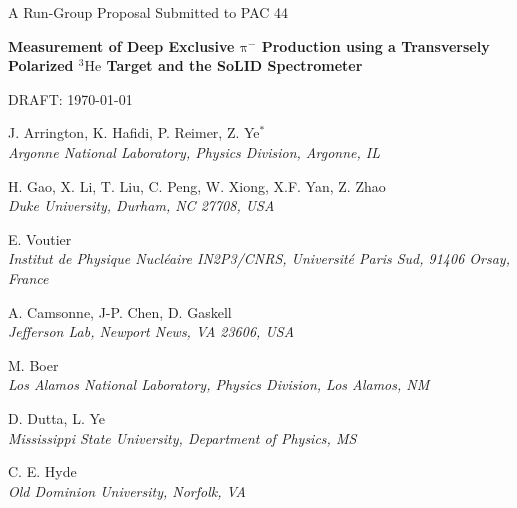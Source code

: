 \documentclass{article}
\begin{document}

\begin{center}

{\Huge A Run-Group Proposal Submitted to PAC 44}

\vspace*{25pt}

{\LARGE\bf
Measurement of Deep Exclusive $\mathrm\pi^-$ Production
using a Transversely Polarized $\mathrm{^{3}He}$ Target
and the SoLID Spectrometer}

\vspace*{2ex}
DRAFT: \today

\vspace*{30pt}

J. Arrington, K. Hafidi, P. Reimer, Z. Ye$^\ast$ \\
\vspace*{5pt}
{\it Argonne National Laboratory, Physics Division, Argonne, IL}
\vspace*{15pt}

H. Gao, X. Li, T. Liu, C. Peng, W. Xiong, X.F. Yan, Z. Zhao\\
\vspace*{5pt}
{\it Duke University, Durham, NC 27708, USA}
\vspace*{15pt}

E. Voutier\\
\vspace*{5pt}
{\it Institut de Physique Nucl\'eaire IN2P3/CNRS, Universit\'e Paris Sud, 
91406 Orsay, France}
\vspace*{15pt}

A. Camsonne,  J-P. Chen, D. Gaskell\\
\vspace*{5pt}
{\it  Jefferson Lab, Newport News, VA 23606, USA}
\vspace*{15pt}

M. Boer\\
\vspace*{5pt}
{\it Los Alamos National Laboratory, Physics Division, Los Alamos, NM}
\vspace*{15pt}

D. Dutta, L. Ye\\
\vspace*{5pt}
{\it Mississippi State University, Department of Physics, MS}
\vspace*{15pt}

C. E. Hyde \\
\vspace*{5pt}
{\it Old Dominion University, Norfolk, VA}
\vspace*{15pt}


\end{center}
\end{document}
